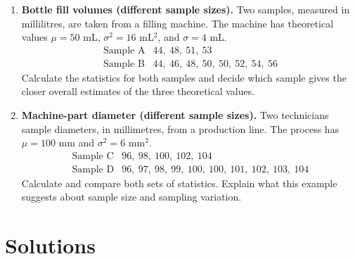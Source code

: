 \begin{enumerate}[
	leftmargin=*,
	itemsep=7pt,
	parsep=0pt,
	topsep=4pt
]
\item
\textbf{Bottle fill volumes (different sample sizes).}
Two samples, measured in millilitres, are taken from a filling machine.
The machine has theoretical values $\mu=50$ mL, $\sigma^2=16$ mL$^2$, and
$\sigma=4$ mL.
\[
\begin{array}{c|l}
	\text{Sample A} & 44,\ 48,\ 51,\ 53\\
	\text{Sample B} & 44,\ 46,\ 48,\ 50,\ 50,\ 52,\ 54,\ 56
\end{array}
\]
Calculate the statistics for both samples and decide which sample gives the
closer overall estimates of the three theoretical values.

\item
\textbf{Machine-part diameter (different sample sizes).}
Two technicians sample diameters, in millimetres, from a production line.
The process has $\mu=100$ mm and $\sigma^2=6$ mm$^2$.
\[
\begin{array}{c|l}
	\text{Sample C} & 96,\ 98,\ 100,\ 102,\ 104\\
	\text{Sample D} & 96,\ 97,\ 98,\ 99,\ 100,\ 100,\ 101,\ 102,\ 103,\ 104
\end{array}
\]
Calculate and compare both sets of statistics. Explain what this example
suggests about sample size and sampling variation.

\end{enumerate}


\newpage
\restoregeometry
\vspace*{-15mm}

\section{Solutions}

